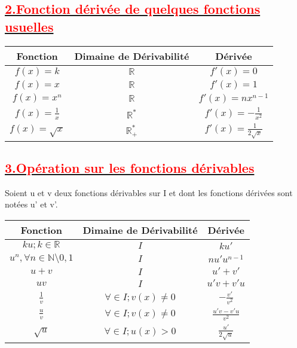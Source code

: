 \documentclass[12pt]{article}
\begin{document}
\subsection*{\underline{\textbf{\textcolor{red}{2.Fonction dérivée de quelques fonctions usuelles}}}}
\begin{center}
\begin{tabular}{|c|c|c|}
\hline
Fonction &Dimaine de Dérivabilité &  Dérivée   \\
\hline
$f(x) = k$& $\mathbb{R}$ & $f'(x)=0$ \\
\hline
$f(x) = x$& $\mathbb{R}$ & $f'(x) = 1$ \\
\hline
$f(x) = x^{n}$& $\mathbb{R}$ & $f'(x) = nx^{n-1}$ \\
\hline
$f(x) = \frac{1}{x}$& $\mathbb{R}^{*}$ & $f'(x) = -\frac{1}{x^{2}}$ \\
\hline
$f(x) = \sqrt{x}$& $\mathbb{R}^{*}_{+}$ & $f'(x) = \frac{1}{2\sqrt{x}}$ \\
\hline
\end{tabular}
\end{center}
\subsection*{\underline{\textbf{\textcolor{red}{3.Opération sur les fonctions dérivables}}}}
Soient u et v deux fonctions dérivables sur I et dont les fonctions dérivées sont notées u' et v'.
\begin{center}
\begin{tabular}{|c|c|c|}
\hline
Fonction &Dimaine de Dérivabilité &  Dérivée   \\
\hline
$ku;k\in \mathbb{R}$& $I$ & $ku'$ \\
\hline
$u^{n}, \forall n \in \mathbb{N}\setminus{0,1}$ & $I$ &$nu'u^{n-1}$\\
\hline
$u+v$& $I$ & $u'+v'$ \\
\hline
$uv$& $I$ & $u'v+v'u$ \\
\hline
$\frac{1}{v}$& $\forall \in I; v(x) \neq 0$ & $-\frac{v'}{v^{2}}$ \\
\hline
$\frac{u}{v}$& $\forall \in I; v(x) \neq 0$ & $\frac{u'v-v'u}{v^{2}}$ \\
\hline
$\sqrt{u}$& $\forall \in I; u(x) > 0$ & $\frac{u'}{2\sqrt{u}}$ \\
\hline
\end{tabular}
\end{center}
\end{document}
